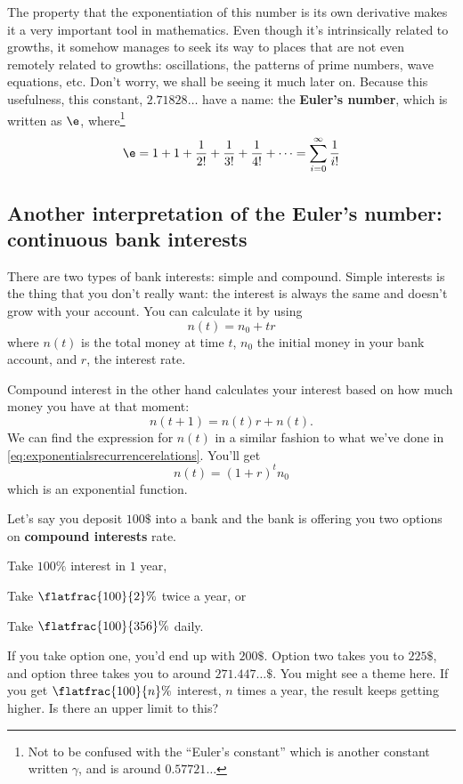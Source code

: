 The property that the exponentiation of this number is its own derivative makes it a very important tool in mathematics. Even though it's intrinsically related to growths, it somehow manages to seek its way to places that are not even remotely related to growths: oscillations, the patterns of prime numbers, wave equations, etc. Don't worry, we shall be seeing it much later on. Because this usefulness, this constant, $2.71828\dots$ have a name: the \textbf{Euler's number}, which is written as $\e$, where\footnote{Not to be confused with the ``Euler's constant'' which is another constant written $\gamma$, and is around $0.57721\dots$}
\begin{equation}
	\e = 1 + 1 + \frac{1}{2!} + \frac{1}{3!} + \frac{1}{4!} + \dots = \sum_{i = 0}^{\infty}\frac{1}{i!}
\end{equation}

\subsection{Another interpretation of the Euler's number: continuous bank interests}

There are two types of bank interests: simple and compound. Simple interests is the thing that you don't really want: the interest is always the same and doesn't grow with your account. You can calculate it by using
\begin{equation}
	n(t) = n_0 + tr
\end{equation}
where $n(t)$ is the total money at time $t$, $n_0$ the initial money in your bank account, and $r$, the interest rate.

Compound interest in the other hand calculates your interest based on how much money you have at that moment:
\begin{equation}
	n(t + 1) = n(t)r + n(t).
\end{equation}
We can find the expression for $n(t)$ in a similar fashion to what we've done in \cref{eq:exponentialsrecurrencerelations}. You'll get
\begin{equation}
	n(t) = (1 + r)^tn_0 \label{eq:compoundinterestformula}
\end{equation}
which is an exponential function.

Let's say you deposit $100\$$ into a bank and the bank is offering you two options on \textbf{compound interests} rate. \begin{enumerate*}[label = \arabic*)]\item Take $100\%$ interest in $1$ year, \item Take $\flatfrac{100}{2}\%$ twice a year, or \item Take $\flatfrac{100}{356}\%$ daily.\end{enumerate*} If you take option one, you'd end up with $200\$$. Option two takes you to $225\$$, and option three takes you to around $271.447\dots\$$. You might see a theme here. If you get $\flatfrac{100}{n}\%$ interest, $n$ times a year, the result keeps getting higher. Is there an upper limit to this?

